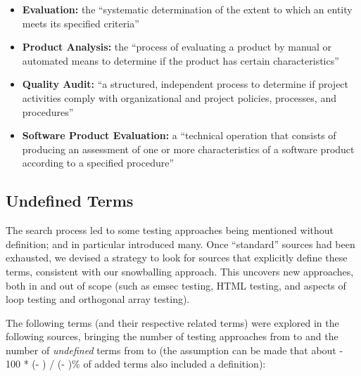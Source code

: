     \begin{itemize}
        \item \textbf{Evaluation:} the ``systematic determination of the extent
              to which an entity meets its specified criteria''
              \citep[p.~167]{IEEE2017}
        \item \textbf{Product Analysis:} the ``process of evaluating a product by
              manual or automated means to determine if the product has certain
              characteristics'' \citep[p.~343]{IEEE2017}
        \item \textbf{Quality Audit:} ``a structured, independent process to
              determine if project activities comply with organizational and
              project policies, processes, and procedures'' \citep[p.~361]{IEEE2017}
        \item \textbf{Software Product Evaluation:} a ``technical operation that
              consists of producing an assessment of one or more characteristics
              of a software product according to a specified procedure''
              \citep[p.~424]{IEEE2017}
    \end{itemize}
\fi
\subsection{Undefined Terms}
\label{undef-terms}

The search process led to some testing approaches being
mentioned without definition;
\citep{IEEE2022} and \citep{Firesmith2015} in particular introduced many.
Once ``standard'' sources had been exhausted, we devised a strategy to
look for sources that explicitly define these terms, consistent with
our snowballing approach. This uncovers new approaches, both in and out of
scope (such as \acf{emsec} testing, HTML testing, and aspects of loop testing and
orthogonal array testing).

The following terms (and their respective related terms) were explored%
\ifnotpaper in the following sources\fi, bringing the number of testing
approaches from \the\TotalBefore{} to \the\TotalAfter{} and the number of
\emph{undefined} terms from \the\UndefBefore{} to \the\UndefAfter{} (the
assumption can be made that about \the{} - 100 * (\UndefAfter -
\UndefBefore) / (\TotalAfter - \TotalBefore)\relax\% of added terms also
included a definition):



\ifnotpaper\else\ieeeTestTermsTable{}\fi

